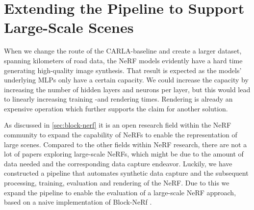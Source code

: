 \section{Extending the Pipeline to Support Large-Scale Scenes} \label{sec:method-block-nerf}

\begin{comment}
Premise: Have found the CARLA-baseline to work well on shorter segments. As discussed multiple papers, the capacity is limited.
Premise \#2: Since I operate in a synthetic environment, I have perfect poses which simplifies the process.
Question: How do I implement Block-NeRF in Nerfstudio, given perfect poses?

\begin{itemize}
    \item Split the dataset into multiple datasets
    \item Train each seperately
    \item Create a camera path
    \item Render the camera path for each NeRF
\end{itemize}
\end{comment}

When we change the route of the CARLA-baseline and create a larger dataset, spanning kilometers of road data, the NeRF models evidently have a hard time generating high-quality image synthesis. That result is expected as the models' underlying MLPs only have a certain capacity. We could increase the capacity by increasing the number of hidden layers and neurons per layer, but this would lead to linearly increasing training -and rendering times. Rendering is already an expensive operation which further supports the claim for another solution.

As discussed in \autoref{sec:block-nerf} it is an open research field within the NeRF community to expand the capability of NeRFs to enable the representation of large scenes. Compared to the other fields within NeRF research, there are not a lot of papers exploring large-scale NeRFs, which might be due to the amount of data needed and the corresponding data capture endeavor. Luckily, we have constructed a pipeline that automates synthetic data capture and the subsequent processing, training, evaluation and rendering of the NeRF. Due to this we expand the pipeline to enable the evaluation of a large-scale NeRF approach, based on a naive implementation of Block-NeRf \cite{tancik_block-nerf_2022}.

